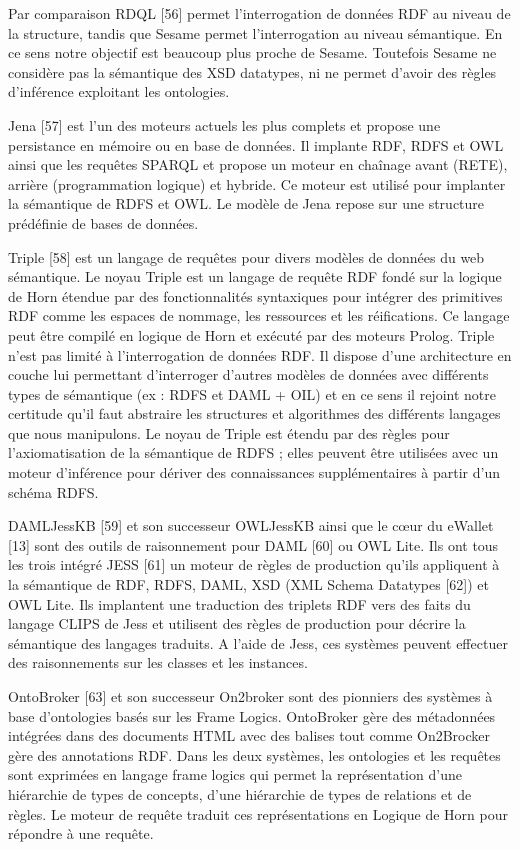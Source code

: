 Par comparaison RDQL [56] permet l'interrogation de données RDF au niveau de la structure, tandis que Sesame permet l’interrogation au niveau sémantique. En ce sens notre objectif est beaucoup plus proche de Sesame. Toutefois Sesame ne considère pas la sémantique des XSD datatypes, ni ne permet d’avoir des règles d'inférence exploitant les ontologies.

Jena [57] est l’un des moteurs actuels les plus complets et propose une persistance en mémoire ou en base de données. Il implante RDF, RDFS et OWL ainsi que les requêtes SPARQL et propose un moteur en chaînage avant (RETE), arrière (programmation logique) et hybride. Ce moteur est utilisé pour implanter la sémantique de RDFS et OWL. Le modèle de Jena repose sur une structure prédéfinie de bases de données.

Triple [58] est un langage de requêtes pour divers modèles de données du web sémantique. Le noyau Triple est un langage de requête RDF fondé sur la logique de Horn étendue par des fonctionnalités syntaxiques pour intégrer des primitives RDF comme les espaces de nommage, les ressources et les réifications. Ce langage peut être compilé en logique de Horn et exécuté par des moteurs Prolog. Triple n'est pas limité à l'interrogation de données RDF. Il dispose d'une architecture en couche lui permettant d'interroger d’autres modèles de données avec différents types de sémantique (ex : RDFS et DAML + OIL) et en ce sens il rejoint notre certitude qu’il faut abstraire les structures et algorithmes des différents langages que nous manipulons. Le noyau de Triple est étendu par des règles pour l’axiomatisation de la sémantique de RDFS ; elles peuvent être utilisées avec un moteur d'inférence pour dériver des connaissances supplémentaires à partir d'un schéma RDFS.

DAMLJessKB [59] et son successeur OWLJessKB ainsi que le cœur du eWallet [13] sont des outils de raisonnement pour DAML [60] ou OWL Lite. Ils ont tous les trois intégré JESS [61] un moteur de règles de production qu’ils appliquent à la sémantique de RDF, RDFS, DAML, XSD (XML Schema Datatypes [62]) et OWL Lite. Ils implantent une traduction des triplets RDF vers des faits du langage CLIPS de Jess et utilisent des règles de production pour décrire la sémantique des langages traduits. A l'aide de Jess, ces systèmes peuvent effectuer des raisonnements sur les classes et les instances.

OntoBroker [63] et son successeur On2broker sont des pionniers des systèmes à base d'ontologies basés sur les Frame Logics. OntoBroker gère des métadonnées intégrées dans des documents HTML avec des balises tout comme On2Brocker gère des annotations RDF. Dans les deux systèmes, les ontologies et les requêtes sont exprimées en langage frame logics qui permet la représentation d'une hiérarchie de types de concepts, d'une hiérarchie de types de relations et de règles. Le moteur de requête traduit ces représentations en Logique de Horn pour répondre à une requête.


